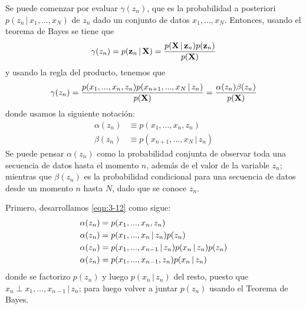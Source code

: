 Se puede comenzar por evaluar $\gamma(z_n)$, que es la probabilidad a posteriori $p(z_n \,|\, x_1, ..., x_N)$ de $z_n$ dado un conjunto de datos $x_1, ..., x_N$. Entonces, usando el teorema de Bayes se tiene que
\begin{equation}
  \gamma(z_n) = p(\textbf{z}_n \,|\, \textbf{X}) = 
    \frac{p(\textbf{X} \,|\, \textbf{z}_n) p(\textbf{z}_n)}{p(\textbf{X})} 
  \label{eqn:3-10}
\end{equation}
y usando la regla del producto, tenemos que
\begin{equation}
  \gamma(z_n) = \frac{
    p(x_1, ..., x_n, z_n) p(x_{n+1}, ..., x_N \,|\, z_n) 
    }
    {p(\textbf{X})} = \frac{\alpha(z_n) \beta(z_n)}{p(\textbf{X})}
  \label{eqn:3-11}
\end{equation}
donde usamos la siguiente notación:
\begin{align}
  \alpha(z_n) &\equiv p(x_1, ..., x_n, z_n) 
\label{eqn:3-12} \\
  \beta(z_n) &\equiv p(x_{n+1}, ..., x_N \,|\, z_n) 
  \label{eqn:3-13}
\end{align}
Se puede pensar $\alpha(z_n)$ como la probabilidad conjunta de observar toda una secuencia de datos hasta el momento $n$, además de el valor de la variable $z_n$; mientras que $\beta(z_n)$ es la probabilidad condicional para una secuencia de datos desde un momento $n$ hasta $N$, dado que se conoce $z_n$. 

Primero, desarrollamos \eqref{eqn:3-12} como sigue:
\begin{align}
  \alpha(z_n) &= p(x_1, ..., x_n, z_n)  
  \notag \\ 
  \alpha(z_n) &= p(x_1, ..., x_n \,|\, z_n)  p(z_n) 
  \notag \\ 
  \alpha(z_n) &= p(x_1, ..., x_{n-1} \,|\, z_n) p(x_n \,|\, z_n)  p(z_n) 
  \notag \\ 
  \alpha(z_n) &= p(x_1, ..., x_{n-1}, z_n) p(x_n \,|\, z_n)
  \notag
\end{align}
donde se factorizo $p(z_n)$ y luego $p(x_n \,|\, z_n)$ del resto, puesto que $x_n \perp x_1, ... , x_{n-1} \,|\, z_n$; para luego volver a juntar $p(z_n)$
usando el Teorema de Bayes.

